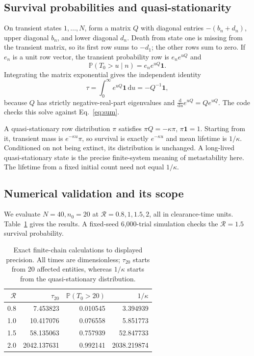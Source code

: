 \documentclass[11pt]{article}
\newcommand{\dd}{\mathrm d}
\newcommand{\Prb}{\mathbb P}
\newcommand{\R}{\mathcal R}
\begin{document}
\subsection{Survival probabilities and quasi-stationarity}
On transient states $1,\ldots,N$, form a matrix $Q$ with diagonal entries $-(b_n+d_n)$, upper diagonal $b_n$, and lower diagonal $d_n$. Death from state one is missing from the transient matrix, so its first row sums to $-d_1$; the other rows sum to zero. If $e_n$ is a unit row vector, the transient probability row is $e_n e^{uQ}$ and
\begin{equation}\label{eq:survival}
\Prb(T_0>u\mid n)=e_n e^{uQ}\boldsymbol1.
\end{equation}
Integrating the matrix exponential gives the independent identity
\begin{equation}
\tau=\int_0^\infty e^{uQ}\boldsymbol1\,\dd u=-Q^{-1}\boldsymbol1,
\end{equation}
because $Q$ has strictly negative-real-part eigenvalues and $\frac{\dd}{\dd u}e^{uQ}=Qe^{uQ}$. The code checks this solve against Eq.~\eqref{eq:sum}.

A quasi-stationary row distribution $\pi$ satisfies $\pi Q=-\kappa\pi$, $\pi\boldsymbol1=1$. Starting from it, transient mass is $e^{-\kappa u}\pi$, so survival is exactly $e^{-\kappa u}$ and mean lifetime is $1/\kappa$. Conditioned on not being extinct, its distribution is unchanged. A long-lived quasi-stationary state is the precise finite-system meaning of metastability here. The lifetime from a fixed initial count need not equal $1/\kappa$.

\subsection{Numerical validation and its scope}
We evaluate $N=40,n_0=20$ at $\R=0.8,1,1.5,2$, all in clearance-time units. Table~\ref{tab:extinction} gives the results. A fixed-seed 6,000-trial simulation checks the $\R=1.5$ survival probability.

\begin{table}[ht]
\centering\small
\begin{tabular}{rrrr}
\toprule $\R$ & $\tau_{20}$ & $\Prb(T_0>20)$ & $1/\kappa$\\\midrule
0.8 & 7.453823 & 0.010545 & 3.394939\\
1.0 & 10.417076 & 0.076558 & 5.851773\\
1.5 & 58.135063 & 0.757939 & 52.847733\\
2.0 & 2042.137631 & 0.992141 & 2038.219874\\\bottomrule
\end{tabular}
\caption{Exact finite-chain calculations to displayed precision. All times are dimensionless; $\tau_{20}$ starts from 20 affected entities, whereas $1/\kappa$ starts from the quasi-stationary distribution.}\label{tab:extinction}
\end{table}
\end{document}
